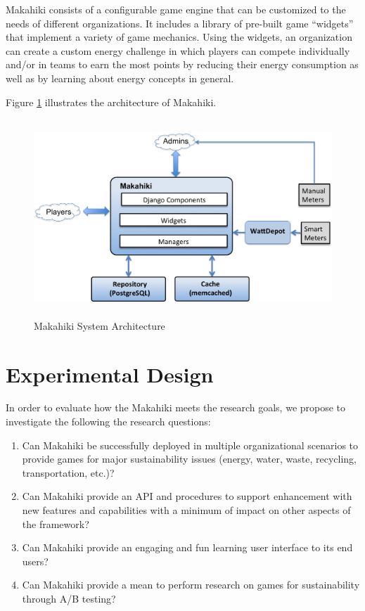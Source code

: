 \documentclass[11pt]{article}
\begin{document}
Makahiki consists of a configurable game engine that can be customized to the needs of
different organizations.  It includes a library of pre-built game ``widgets'' that
implement a variety of game mechanics.  Using the widgets, an organization can create a
custom energy challenge in which players can compete individually and/or in teams to earn
the most points by reducing their energy consumption as well as by learning about energy
concepts in general.

Figure \ref{fig:system-architecture} illustrates
the architecture of Makahiki.

\begin{figure}[htbp] %
   \centering
   \includegraphics[height=20em]{system-architecture} 
   \caption{Makahiki System Architecture}
   \label{fig:system-architecture}
\end{figure}


\section{Experimental Design}

In order to evaluate how the Makahiki meets the research goals, we propose to investigate the following the research questions:

\begin{enumerate}

\em \item Can Makahiki be successfully deployed in multiple organizational scenarios to provide games for major sustainability issues (energy, water, waste, recycling, transportation, etc.)? \em
\em \item Can Makahiki provide an API and procedures to support enhancement with new features and capabilities with a minimum of impact on other aspects of the framework? \em
\em \item Can Makahiki provide an engaging and fun learning user interface to its end users? \em
\em \item Can Makahiki provide a mean to perform research on games for sustainability through A/B testing? \em

\end{enumerate}
\end{document}
